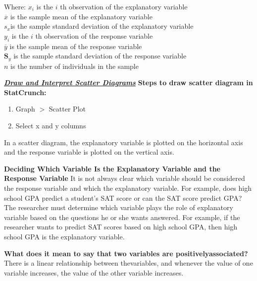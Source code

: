 \documentclass{report}
\begin{document}
\begin{itemize}
            Where:
            \bigbreak \noindent 
                $x_i$ is the $i$ th observation of the explanatory variable \\
                $\overline{x}$ is the sample mean of the explanatory variable \\
                $s_{x} $is the sample standard deviation of the explanatory variable \\
                $y_i$ is the $i$ th observation of the response variable \\
                $\overline{y}$ is the sample mean of the response variable \\
                $\mathbf{S}_y$ is the sample standard deviation of the response variable \\
                $n$ is the number of individuals in the sample



    \end{itemize}

    \pagebreak \bigbreak \noindent
    \textbf{\textit{\underline{Draw and Interpret Scatter Diagrams}}}
    \bigbreak \noindent 
    \textbf{Steps to draw scatter diagram in StatCrunch:}
    \begin{enumerate}
        \item Graph $> $ Scatter Plot
        \item Select x and y columns
    \end{enumerate}
    \bigbreak \noindent 
    In a scatter​ diagram, the explanatory  variable is plotted on the horizontal axis and the response  variable is plotted on the vertical axis.

    \bigbreak \noindent 
    \textbf{Deciding Which Variable Is the Explanatory Variable and the Response Variable}
    \bigbreak \noindent 
    It is not always clear which variable should be considered the response variable and which the explanatory variable. For example, does high school GPA predict a student's SAT score or can the SAT score predict GPA? The researcher must determine which variable plays the role of explanatory variable based on the questions he or she wants answered. For example, if the researcher wants to predict SAT scores based on high school GPA, then high school GPA is the explanatory variable.

    \bigbreak \noindent 
    \textbf{What does it mean to say that two variables are positively​ associated?}
    \bigbreak \noindent 
    There is a linear relationship between the​ variables, and whenever the value of one variable​ increases, the value of the other variable increases.
\end{document}
